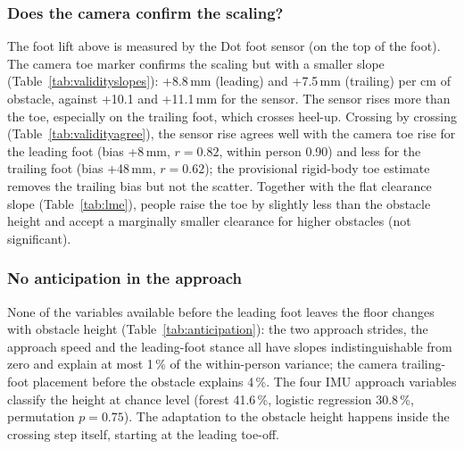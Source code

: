 \subsubsection{Does the camera confirm the scaling?}

The foot lift above is measured by the Dot foot sensor (on the top of the foot). The camera toe marker confirms the scaling but with a
smaller slope (Table~\ref{tab:validityslopes}): +8.8\,mm (leading) and +7.5\,mm (trailing) per cm of obstacle, against +10.1 and
+11.1\,mm for the sensor. The sensor rises more than the toe, especially on the trailing foot, which crosses heel-up. Crossing by
crossing (Table~\ref{tab:validityagree}), the sensor rise agrees well with the camera toe rise for the leading foot (bias +8\,mm,
$r = 0.82$, within person 0.90) and less for the trailing foot (bias +48\,mm, $r = 0.62$); the provisional rigid-body toe estimate
removes the trailing bias but not the scatter. Together with the flat clearance slope (Table~\ref{tab:lme}), people raise the toe by
slightly less than the obstacle height and accept a marginally smaller clearance for higher obstacles (not significant).

\begin{table}[htbp]
\centering
\caption{Foot lift per cm of obstacle measured by the camera toe marker and by the Dot (mixed model, 95\,\% CI).}
\label{tab:validityslopes}

\end{table}

\begin{table}[htbp]
\centering
\caption{Agreement of the Dot foot lift with the camera toe rise, per crossing (Bland--Altman bias, SD and 95\,\% limits; correlation
overall and within participant).}
\label{tab:validityagree}

\end{table}

\subsubsection{No anticipation in the approach}

None of the variables available before the leading foot leaves the floor changes with obstacle height (Table~\ref{tab:anticipation}):
the two approach strides, the approach speed and the leading-foot stance all have slopes indistinguishable from zero and explain at
most 1\,\% of the within-person variance; the camera trailing-foot placement before the obstacle explains 4\,\%. The four IMU
approach variables classify the height at chance level (forest 41.6\,\%, logistic regression 30.8\,\%, permutation $p = 0.75$).
The adaptation to the obstacle height happens inside the crossing step itself, starting at the leading toe-off.

\begin{table}[htbp]
\centering
\caption{Anticipation: change per cm of obstacle of the variables before the crossing step (mixed model) and their within-person
$\eta^2$.}
\label{tab:anticipation}

\end{table}
